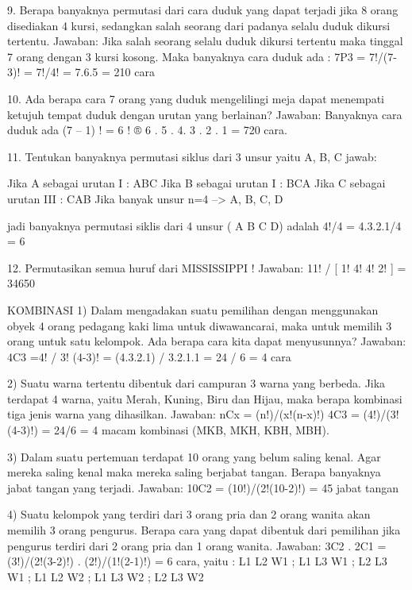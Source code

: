 \documentclass[11pt,fleqn]{book} %
\begin{document}
{9. Berapa banyaknya permutasi dari cara duduk yang dapat terjadi jika 8 orang disediakan 4 kursi, sedangkan salah seorang dari padanya selalu duduk dikursi tertentu.
Jawaban:
Jika salah seorang selalu duduk dikursi tertentu maka tinggal 7 orang dengan 3 kursi kosong.
Maka banyaknya cara duduk ada :
7P3 = 7!/(7-3)!
       = 7!/4!
       = 7.6.5
       = 210 cara

10. Ada berapa cara 7 orang yang duduk mengelilingi meja dapat menempati ketujuh tempat duduk dengan urutan yang berlainan?
Jawaban:
Banyaknya cara duduk ada (7 – 1) ! = 6 ! ® 6 . 5 . 4. 3 . 2 . 1 = 720 cara.

 11. Tentukan banyaknya permutasi siklus dari 3 unsur yaitu A, B, C
jawab:

Jika A sebagai urutan I : ABC
Jika B sebagai urutan I : BCA
Jika C sebagai urutan III : CAB
Jika banyak unsur n=4 –> A, B, C, D

jadi banyaknya permutasi siklis dari 4 unsur ( A B C D) adalah 4!/4 = 4.3.2.1/4 = 6

 12. Permutasikan semua huruf dari MISSISSIPPI !
Jawaban:
11! / [ 1! 4! 4! 2! ] = 34650








KOMBINASI
1) Dalam mengadakan suatu pemilihan dengan menggunakan obyek 4 orang pedagang kaki lima untuk diwawancarai, maka untuk memilih 3 orang untuk satu kelompok. Ada berapa cara kita dapat menyusunnya?
Jawaban:
4C3 =4! / 3! (4-3)!
        = (4.3.2.1) / 3.2.1.1
        = 24 / 6
        = 4 cara

 2) Suatu warna tertentu dibentuk dari campuran 3 warna yang berbeda. Jika terdapat 4 warna, yaitu Merah, Kuning, Biru dan Hijau, maka berapa kombinasi tiga jenis warna yang dihasilkan.
Jawaban:
nCx = (n!)/(x!(n-x)!) 
4C3 = (4!)/(3!(4-3)!)
        = 24/6 = 4 macam kombinasi (MKB, MKH, KBH, MBH).

3) Dalam suatu pertemuan terdapat 10 orang yang belum saling kenal. Agar mereka saling kenal maka mereka saling berjabat tangan. Berapa banyaknya jabat tangan yang terjadi.
Jawaban:
10C2 = (10!)/(2!(10-2)!) = 45 jabat tangan

4) Suatu kelompok yang terdiri dari 3 orang pria dan 2 orang wanita akan memilih 3 orang pengurus. Berapa cara yang dapat dibentuk dari pemilihan jika pengurus terdiri dari 2 orang pria dan 1 orang wanita.
Jawaban:
3C2 . 2C1 = (3!)/(2!(3-2)!) . (2!)/(1!(2-1)!) = 6 cara, yaitu : L1 L2 W1 ; L1 L3 W1 ; L2 L3 W1 ; L1 L2 W2 ; L1 L3 W2 ; L2 L3 W2

}
\end{document}
